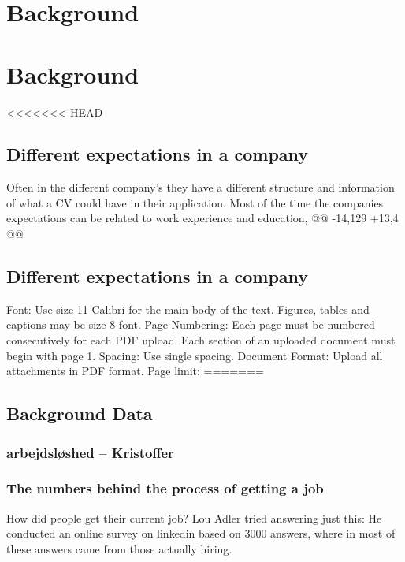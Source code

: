 \section{Background}\label{sec:background}
\section{Background}\label{sec:background}
<<<<<<< HEAD
\subsection{Different expectations in a company}
Often in the different company's they have a different structure and information of what a CV could have in their application.
Most of the time the companies expectations can be related to work experience and education,
@@ -14,129 +13,4 @@ \subsection{Different expectations in a company}
Font: Use size 11 Calibri for the main body of the text. Figures, tables and captions may be size 8 font.
Page Numbering: Each page must be numbered consecutively for each PDF upload. Each section of an uploaded document must begin with page 1.
Spacing: Use single spacing.
Document Format: Upload all attachments in PDF format.
Page limit: 
=======



\subsection{Background Data}

\subsubsection{arbejdsløshed -- Kristoffer}


\subsubsection{The numbers behind the process of getting a job}
How did people get their current job?
Lou Adler tried answering just this: He conducted an online survey
on linkedin based on 3000 answers, where in most of these answers
came from those actually hiring.

